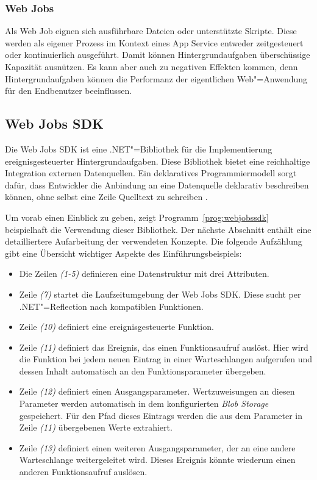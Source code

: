 \subsubsection{Web Jobs}

Als Web Job eignen sich ausführbare Dateien oder unterstützte Skripte. Diese werden als eigener Prozess im Kontext eines App Service entweder zeitgesteuert oder kontinuierlich ausgeführt. Damit können Hintergrundaufgaben überschüssige Kapazität ausnützen. Es kann aber auch zu negativen Effekten kommen, denn Hintergrundaufgaben können die Performanz der eigentlichen Web"=Anwendung für den Endbenutzer beeinflussen.

\subsection{Web Jobs SDK}
\label{subsec:webjobssdk}

Die Web Jobs SDK ist eine .NET"=Bibliothek für die Implementierung ereignisgesteuerter Hintergrundaufgaben. Diese Bibliothek bietet eine reichhaltige Integration externen Datenquellen. Ein deklaratives Programmiermodell sorgt dafür, dass Entwickler die Anbindung an eine Datenquelle deklarativ beschreiben können, ohne selbst eine Zeile Quelltext zu schreiben \cite{WebJobsSdkBindingAttributes}.

Um vorab einen Einblick zu geben, zeigt Programm~\ref{prog:webjobssdk} beispielhaft die Verwendung dieser Bibliothek. Der nächste Abschnitt enthält eine detailliertere Aufarbeitung der verwendeten Konzepte. Die folgende Aufzählung gibt eine Übersicht wichtiger Aspekte des Einführungsbeispiels:

\begin{itemize}
	\item Die Zeilen \textit{(1-5)} definieren eine Datenstruktur mit drei Attributen.
	\item Zeile \textit{(7)} startet die Laufzeitumgebung der Web Jobs SDK. Diese sucht per .NET"=Reflection nach kompatiblen Funktionen.
	\item Zeile \textit{(10)} definiert eine ereignisgesteuerte Funktion.
	\item Zeile \textit{(11)} definiert das Ereignis, das einen Funktionsaufruf auslöst. Hier wird die Funktion bei jedem neuen Eintrag in einer Warteschlangen aufgerufen und dessen Inhalt automatisch an den Funktionsparameter übergeben.
	\item Zeile \textit{(12)} definiert einen Ausgangsparameter. Wertzuweisungen an diesen Parameter werden automatisch in dem konfigurierten \textit{Blob Storage} gespeichert. Für den Pfad dieses Eintrags werden die aus dem Parameter in Zeile \textit{(11)} übergebenen Werte extrahiert.
	\item Zeile \textit{(13)} definiert einen weiteren Ausgangsparameter, der an eine andere Warteschlange weitergeleitet wird. Dieses Ereignis könnte wiederum einen anderen Funktionsaufruf auslösen. 
\end{itemize}

